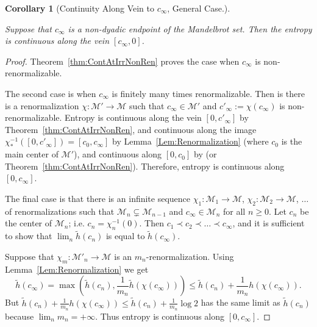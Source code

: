 \documentclass[12pt]{amsart}
\newcommand{\M}{\mathscr M}
\newcommand{\0}{\texttt{0}}
\newcommand{\1}{\texttt{1}}
\newtheorem{corollary}[theorem]{Corollary}
\theoremstyle{definition}
\numberwithin{equation}{section}
\newcommand{\lineclear}{\rule{0pt}{2pt}\newline}
\newcounter{reminder}[section]
\newcounter{treminder}
\newcommand{\reminder}[1]{\stepcounter{reminder}\stepcounter{treminder}$\rhd$\textsl{#1}$\lhd$\marginpar{\thesection.\arabic{reminder}$\lhd\rhd\lhd\rhd\lhd\rhd$}}
\renewcommand{\reminder}[1]{}
\begin{document}
\begin{corollary}[Continuity Along Vein to $c_{\infty}$, General Case.]
\label{cor:RadialContin}
\lineclear
Suppose that $c_{\infty}$ is a non-dyadic endpoint of the Mandelbrot set. Then the entropy is continuous along the vein $[c_{\infty}, 0]$.
\end{corollary}
\begin{proof}
Theorem~\ref{thm:ContAtIrrNonRen} proves the case when $c_{\infty}$ is non-renormalizable. 

The second case is when $c_{\infty}$ is finitely many times renormalizable. Then is there is a renormalization $\chi \colon\M'\to \M$ such that $c_{\infty}\in \M'$ and $c'_{\infty}:=\chi(c_{\infty})$ is non-renormalizable.  Entropy is continuous along the vein $[0,c'_{\infty}]$ by Theorem~\ref{thm:ContAtIrrNonRen}, and continuous along the image $\chi_*^{-1}([0,c'_{\infty}])=[c_0,c_{\infty}]$ by Lemma~\ref{Lem:Renormalization} (where $c_0$ is the main center of $\M'$), and continuous along $[0,c_0]$ by \cite[Theorem~4.9]{Jung} (or Theorem~\ref{thm:ContAtIrrNonRen}). Therefore, entropy is continuous along $[0,c_{\infty}]$.

The final case is that  there is an infinite sequence $\chi_1:\M_1\to \M$,  $\chi_2:\M_2\to \M$, $\dots$  of renormalizations such that $\M_n \subsetneq \M_{n-1}$ and $c_\infty\in \M_n$ for all $n\ge 0$. Let $c_n$ be the center of $\M_n$; i.e. $c_n=\chi_n ^{-1}(0)$. Then $c_1\prec c_2 \prec \dots \prec c_{\infty}$, and it is sufficient to show that $\lim_n \tilde h(c_n)$ is equal to $\tilde h(c_{\infty})$.

Suppose that $\chi_m\colon\M'_n\to \M$ is an $m_n$-renormalization. Using Lem\-ma~\ref{Lem:Renormalization} we get
\[\tilde h(c_{\infty})=\max\left(\tilde h(c_n),\frac 1 {m_n}\tilde h(\chi( c_{\infty}))\right)\le \tilde h(c_n)+\frac 1 {m_n}h(\chi( c_{\infty})).\] But
$\tilde h(c_n)+\frac 1 {m_n}h(\chi( c_{\infty}))\le \tilde h(c_n)+\frac 1 {m_n}\log 2$ has the same limit as $\tilde h(c_n)$ because $\lim_n m_n = +\infty$. Thus entropy is continuous along $[0,c_{\infty}]$.
\end{proof}




\reminder{Total number of reminders: \arabic{treminder}}




\newpage

\renewcommand{\top}{{\scriptscriptstyle\mathrm{top}}}
\newcommand{\comb}{{\scriptscriptstyle\mathrm{comb}}}
\end{document}
